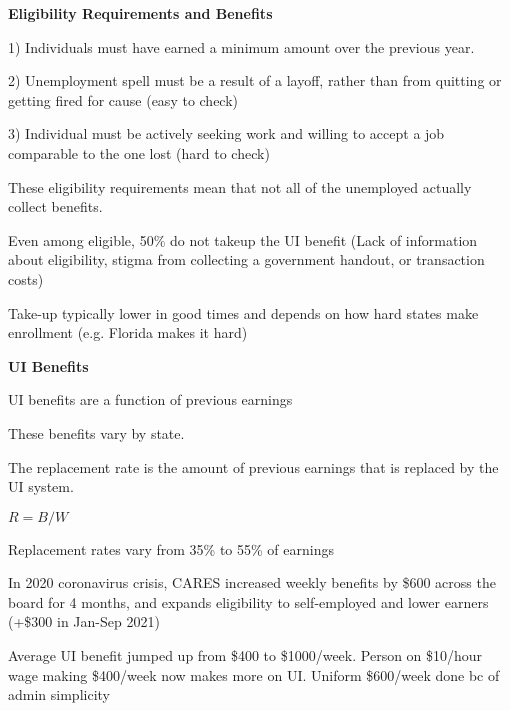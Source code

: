 \documentclass[landscape]{slides}
\begin{document}
\begin{slide}
\begin{center}
{\bf Eligibility Requirements and Benefits}
\end{center}

1) Individuals must have earned a minimum amount over the previous year.

2) Unemployment spell must be a result of a layoff, rather than from quitting or getting fired for cause
(easy to check)

3) Individual must be actively seeking work and willing to accept a job comparable to the one lost
(hard to check)

These eligibility requirements mean that not all of the unemployed actually collect benefits.

Even among eligible, 50\% do not takeup the UI benefit
(Lack of information about eligibility, stigma from collecting a government handout, or transaction costs)

Take-up typically lower in good times and depends on how hard
states make enrollment (e.g. Florida makes it hard)


\end{slide}

\begin{slide}

\end{slide}



\begin{slide}
\begin{center}
{\bf UI  Benefits}
\end{center}

UI benefits are a function of previous earnings

These benefits vary by state.

The replacement rate is the amount of previous earnings that is replaced by the UI system.

$R = B/W$

Replacement rates vary from 35\% to 55\% of earnings

In 2020 coronavirus crisis, CARES increased weekly benefits by \$600 across the board for 4 months,
and expands eligibility to self-employed and lower earners (+\$300 in Jan-Sep 2021)

Average UI benefit jumped up from \$400 to \$1000/week. Person on \$10/hour wage making \$400/week now
makes more on UI. Uniform \$600/week done bc of admin simplicity


\end{slide}
\end{document}
